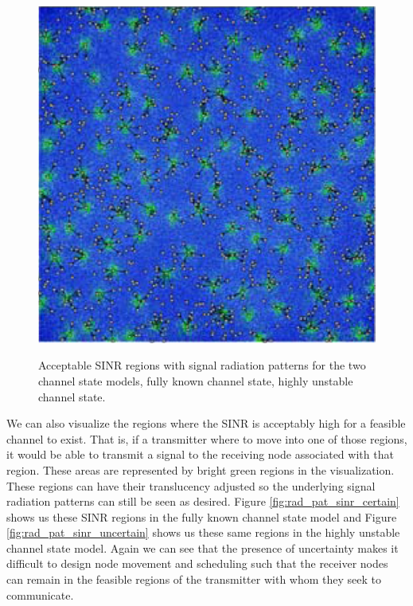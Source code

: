 \begin{figure}[ht]
\begin{center}
{		\includegraphics[scale=0.45]{images/network_vis/rad_pat_sinr_uncertain.eps}
		\label{fig:rad_pat_sinr_uncertain}
}
\end{center}
\caption{Acceptable SINR regions with signal radiation patterns for the two channel state models,  fully known channel state,  highly unstable channel state.}
\label{fig:rad_pat_sinr}
\end{figure}

We can also visualize the regions where the SINR is acceptably high for a feasible channel to exist.  That is, if a transmitter where to move into one of those regions, it would be able to transmit a signal to the receiving node associated with that region.  These areas are represented by bright green regions in the visualization.  These regions can have their translucency adjusted so the underlying signal radiation patterns can still be seen as desired.  Figure \ref{fig:rad_pat_sinr_certain} shows us these SINR regions in the fully known channel state model and Figure \ref{fig:rad_pat_sinr_uncertain} shows us these same regions in the highly unstable channel state model. Again we can see that the presence of uncertainty makes it difficult to design node movement and scheduling such that the receiver nodes can remain in the feasible regions of the transmitter with whom they seek to communicate.


